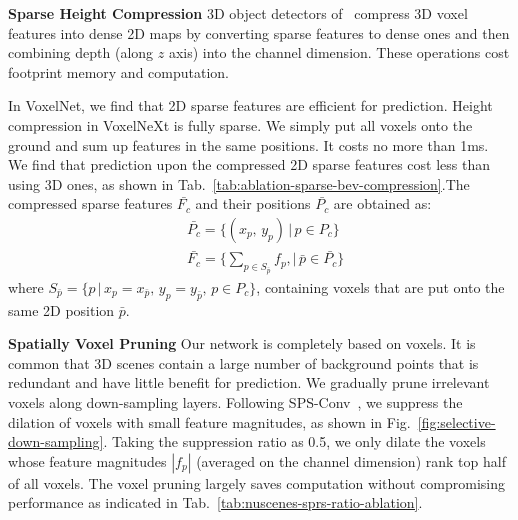 \documentclass[10pt,twocolumn,letterpaper]{article}
\begin{document}
\vspace{0.5em}
\noindent
\textbf{Sparse Height Compression}
3D object detectors of~\cite{centerpoint, pvrcnn, voxel-rcnn} compress 3D voxel features into dense 2D maps by converting sparse features to dense ones and then combining depth (along $z$ axis) into the channel dimension. These operations cost footprint memory and computation.

In VoxelNet, we find that 2D sparse features are efficient for prediction. Height compression in VoxelNeXt is fully sparse. We simply put all voxels onto the ground and sum up features in the same positions. It costs no more than 1ms. We find that prediction upon the compressed 2D sparse features cost less than using 3D ones, as shown in Tab.~\ref{tab:ablation-sparse-bev-compression}.The compressed sparse features $\bar{F_c}$ and their positions $\bar{P_c}$ are obtained as:
\begin{equation}
\label{eq:hight-compress}
\begin{aligned}
&\bar{P_c} = \{(x_p, \, y_p) \,|\, p\in P_c\} \\
&\bar{F_c} = \{\sum_{p\in S_{\bar{p}}} f_p ,|\, \bar{p}\in \bar{P_c}\}
\end{aligned}
\end{equation}
where $S_{\bar{p}} = \{p \, | \, x_p=x_{\bar{p}},\, y_p=y_{\bar{p}},\, p\in P_c\}$, containing voxels that are put onto the same 2D position $\bar{p}$. 


\vspace{0.5em}
\noindent
\textbf{Spatially Voxel Pruning}
Our network is completely based on voxels. It is common that 3D scenes contain a large number of background points that is redundant and have little benefit for prediction. We gradually prune irrelevant voxels along down-sampling layers. Following SPS-Conv~\cite{spatial-pruned-conv}, we suppress the dilation of voxels with small feature magnitudes, as shown in Fig.~\ref{fig:selective-down-sampling}. Taking the suppression ratio as 0.5, we only dilate the voxels whose feature magnitudes $|f_p|$ (averaged on the channel dimension) rank top half of all voxels. The voxel pruning largely saves computation without compromising performance as indicated in Tab.~\ref{tab:nuscenes-sprs-ratio-ablation}. 
\end{document}
